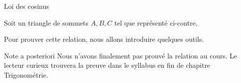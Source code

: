 \documentclass[french,xcolor=svgnames]{beamer}
\begin{document}
\begin{frame}{Loi des cosinus}
\vspace*{-1\baselineskip}
  \begin{minipage}{0.59\linewidth}
    Soit un triangle de sommets \(A,B,C\) tel que représenté ci-contre, 
\end{minipage}
\begin{minipage}{0.39\linewidth}
\end{minipage}
\pause

Pour prouver cette relation, nous allons introduire quelques outils. 
\begin{block}{Note a posteriori}
  Nous n'avons finalement pas prouvé la relation au cours. Le lecteur curieux trouvera la preuve dans le syllabus en fin de chapitre Trigonométrie.
\end{block}
\end{frame}
\end{document}
